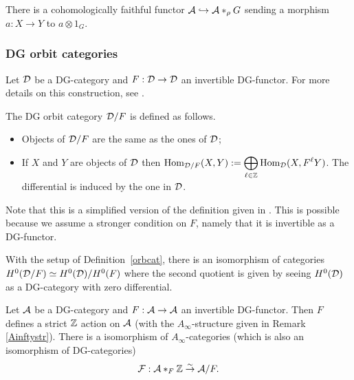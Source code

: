 \documentclass[12pt]{article}
\begin{document}
	\begin{remark}
		There is a cohomologically faithful functor ${\cal{A}} \hookrightarrow {\cal{A}} *_\rho G$ sending a morphism $a: X \to Y$ to $a \otimes 1_G$.
	\end{remark}
	
	\subsubsection*{DG orbit categories}
	
	Let ${\cal{D}}$ be a DG-category and $F: {\cal{D}} \to {\cal{D}}$ an invertible DG-functor. For more details on this construction, see \cite{KelOrb}.
	
	\begin{definition}
		\label{orbcat}
		The DG orbit category ${\cal{D}}/F$ is defined as follows.
		\begin{itemize}
			\item Objects of ${\cal{D}}/F$ are the same as the ones of ${\cal{D}}$;
			\item If $X$ and $Y$ are objects of ${\cal{D}}$ then $\textup{Hom}_{{\cal{D}}/F}(X,Y):= \displaystyle\bigoplus_{\ell \in \mathbb{Z}} \textup{Hom}_{{\cal{D}}}(X,F^\ell Y)$. The differential is induced by the one in ${\cal{D}}$.
		\end{itemize}
		Note that this is a simplified version of the definition given in \cite{KelOrb}. This is possible because we assume a stronger condition on $F$, namely that it is invertible as a DG-functor.
	\end{definition}
	
	\begin{remark}{\cite[Section 5.1]{KelOrb}}
		\label{DGorb}
		With the setup of Definition~\ref{orbcat}, there is an isomorphism of categories $H^0({\cal{D}}/F) \simeq H^0({\cal{D}})/H^0(F)$ where the second quotient is given by seeing $H^0({\cal{D}})$ as a DG-category with zero differential.
	\end{remark}
	
	\begin{proposition}
		\label{sameorbit}
		Let ${\cal{A}}$ be a DG-category and $F: {\cal{A}} \to {\cal{A}}$ an invertible DG-functor. Then $F$ defines a strict $\mathbb{Z}$ action on ${\cal{A}}$ (with the $A_\infty$-structure given in Remark \ref{Ainftystr}). There is a isomorphism of $A_\infty$-categories (which is also an isomorphism of DG-categories)
		\[{\cal{F}}: {\cal{A}} *_F \mathbb{Z} \overset{\sim}{\to} {\cal{A}} / F.\]
	\end{proposition}
	
\end{document}
